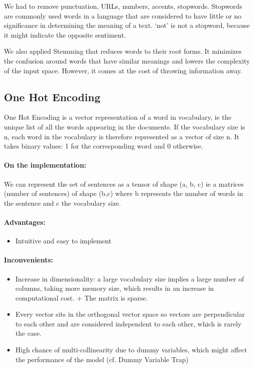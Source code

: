 \documentclass{article}
\begin{document}
We had to remove punctuation, URLs, numbers, accents, stopwords.
Stopwords are commonly used words in a language that are considered to have little or no significance in determining the meaning of a text.
`not' is not a stopword, because it might indicate the opposite sentiment.

We also applied Stemming that reduces words to their root forms. It minimizes the confusion around words that have similar meanings and lowers the complexity of the input space. However, it comes at the cost of throwing information away.

\subsection{One Hot Encoding}

One Hot Encoding is a vector representation of a word in vocabulary, ie the unique list of all the words appearing in the documents.
If the vocabulary size is n, each word in the vocabulary is therefore represented as a vector of size n. It takes binary values: 1 for the corresponding word and 0 otherwise.

\paragraph{On the implementation:}

We can represent the set of sentences as a tensor of shape (a, b, c) ie a matrices (number of sentences) of shape (b,c) where b represents the number of words in the sentence and c the vocabulary size.

\paragraph{Advantages:}

\begin{itemize}
  \item Intuitive and easy to implement
\end{itemize}

\paragraph{Inconvenients:}

\begin{itemize}
  \item Increase in dimensionality: a large vocabulary size implies a large number of columns, taking more memory size, which results in an increase in computational cost. + The matrix is sparse.
  \item Every vector sits in the orthogonal vector space so vectors are perpendicular to each other and are considered independent to each other, which is rarely the case.
  \item High chance of multi-collinearity due to dummy variables, which might affect the performance of the model (cf. Dummy Variable Trap)
\end{itemize}
\end{document}
